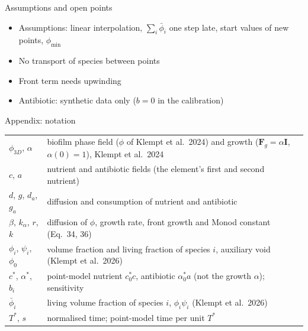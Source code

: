 \documentclass[aspectratio=169,11pt]{beamer}
\begin{document}
\begin{frame}{Assumptions and open points}
\begin{itemize}\setlength{\itemsep}{8pt}
  \item \textcolor{warn}{Assumptions}: linear interpolation, $\sum_i\bar\phi_i$ one step late, start values of new points, $\phi_{\min}$
  \item No transport of species between points
  \item Front term needs upwinding
  \item Antibiotic: synthetic data only ($b=0$ in the calibration)
\end{itemize}
\end{frame}

\appendix
\begin{frame}{Appendix: notation}
\footnotesize
\begin{tabular}{@{}ll@{}}
\toprule
$\phi_{3D}$, $\alpha$ & biofilm phase field ($\phi$ of Klempt et al.\ 2024) and growth ($\mathbf F_g=\alpha\mathbf I$, $\alpha(0)=1$), Klempt et al.\ 2024\\
$c$, $a$ & nutrient and antibiotic fields (the element's first and second nutrient)\\
$d$, $g$, $d_a$, $g_a$ & diffusion and consumption of nutrient and antibiotic\\
$\beta$, $k_\alpha$, $r$, $k$ & diffusion of $\phi$, growth rate, front growth and Monod constant (Eq.\ 34, 36)\\
$\phi_i$, $\psi_i$, $\phi_0$ & volume fraction and living fraction of species $i$, auxiliary void (Klempt et al.\ 2026)\\
$c^*$, $\alpha^*$, $b_i$ & point-model nutrient $c^*_0c$, antibiotic $\alpha^*_0a$ (not the growth $\alpha$); sensitivity\\
$\bar\phi_i$ & living volume fraction of species $i$, $\phi_i\psi_i$ (Klempt et al.\ 2026)\\
$T^*$, $s$ & normalised time; point-model time per unit $T^*$\\
\bottomrule
\end{tabular}
\end{frame}
\end{document}
